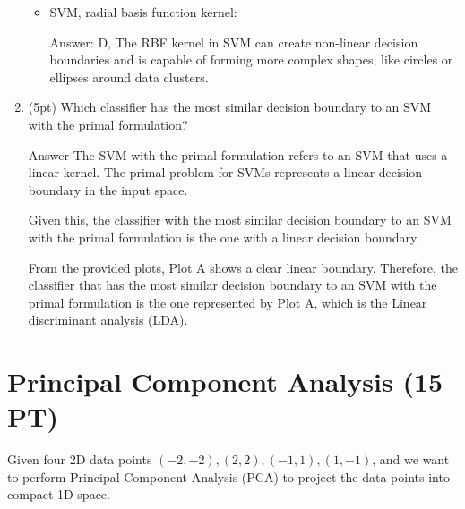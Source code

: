 \documentclass[10pt, a4paper]{article}
\begin{document}
\begin{enumerate}[label = \alph*]
\begin{itemize}
        \item SVM, radial basis function kernel:

        \item[Answer:] D, The RBF kernel in SVM can create non-linear decision boundaries and is capable of forming more complex shapes, like circles or ellipses around data clusters.
    \end{itemize}

    \item (5pt) Which classifier has the most similar decision boundary to an SVM with the primal formulation?

    \item[Answer] The SVM with the primal formulation refers to an SVM that uses a linear kernel. The primal problem for SVMs represents a linear decision boundary in the input space.

    Given this, the classifier with the most similar decision boundary to an SVM with the primal formulation is the one with a linear decision boundary.
    
    From the provided plots, Plot A shows a clear linear boundary. Therefore, the classifier that has the most similar decision boundary to an SVM with the primal formulation is the one represented by Plot A, which is the Linear discriminant analysis (LDA).
\end{enumerate}

\section{Principal Component Analysis (15 PT)}
Given four 2D data points $(-2,-2),(2,2),(-1,1),(1,-1)$, and we want to perform Principal Component Analysis (PCA) to project the data points into compact 1D space.
\end{document}
